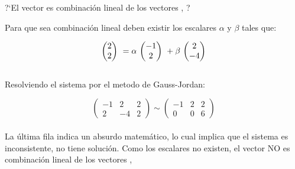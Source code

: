 
\begin{ejemplo}
?`El vector  es combinación lineal de los vectores 
, ?
\end{ejemplo}


Para que sea combinación lineal deben existir los escalares
$\alpha$ y $\beta$ tales que:

\[\mbox{ \ensuremath{\begin{pmatrix} 2\\ 2\\ \end{pmatrix} } }=\alpha\mbox{ \ensuremath{\begin{pmatrix} -1\\ 2\\ \end{pmatrix} } }+
\beta\mbox{ \ensuremath{\begin{pmatrix} 2\\ -4\\ \end{pmatrix} } }\]
~\\
Resolviendo el sistema por el metodo de Gauss-Jordan:

\[
\left(
\begin{array}{rr|r}
-1 & 2 & 2\\
2&-4&2
\end{array}
\right)
\sim
\left(
\begin{array}{rr|r}
-1 & 2 & 2\\
0&0&6
\end{array}
\right)
\]
~\\
La última fila indica un absurdo matem\'atico, lo cual implica que el sistema es inconsistente, no
tiene solución. Como los escalares no existen, el vector  NO es combinación lineal de los vectores 
, 

\newpage
%
%
%
%
%
%
%
%

